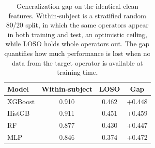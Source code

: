 \begin{table}[t]
\centering
\small
\caption{Generalization gap on the identical clean features. Within-subject is a
stratified random 80/20 split, in which the same operators appear in both training
and test, an optimistic ceiling, while LOSO holds whole operators out. The gap
quantifies how much performance is lost when no data from the target operator is
available at training time.}
\label{tab:gap}
\begin{tabular}{lccc}
\toprule
Model & Within-subject & LOSO & Gap \\
\midrule
XGBoost & 0.910 & 0.462 & +0.448 \\
HistGB & 0.911 & 0.451 & +0.459 \\
RF & 0.877 & 0.430 & +0.447 \\
MLP & 0.846 & 0.374 & +0.472 \\
\bottomrule
\end{tabular}
\end{table}
